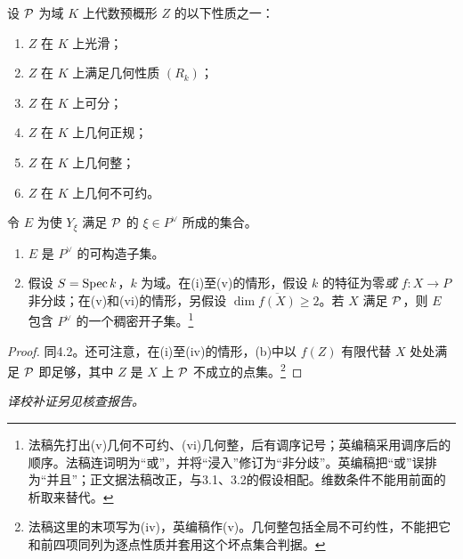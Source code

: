 设 $\mathcal P$ 为域 $K$ 上代数预概形 $Z$ 的以下性质之一：
\begin{enumerate}[label=(\roman*),nosep]
\item $Z$ 在 $K$ 上光滑；
\item $Z$ 在 $K$ 上满足几何性质 $(R_k)$；
\item $Z$ 在 $K$ 上可分；
\item $Z$ 在 $K$ 上几何正规；
\item $Z$ 在 $K$ 上几何整；
\item $Z$ 在 $K$ 上几何不可约。
\end{enumerate}
令 $E$ 为使 $Y_\xi$ 满足 $\mathcal P$ 的 $\xi\in P^\vee$ 所成的集合。
\begin{enumerate}[label=(\alph*),nosep]
\item $E$ 是 $P^\vee$ 的可构造子集。
\item 假设 $S=\operatorname{Spec} k$，$k$ 为域。在(i)至(v)的情形，假设 $k$ 的特征为零\emph{或} $f:X\to P$ 非分歧；在(v)和(vi)的情形，另假设 $\dim\overline{f(X)}\geq2$。若 $X$ 满足 $\mathcal P$，则 $E$ 包含 $P^\vee$ 的一个稠密开子集。\footnote{法稿先打出(v)几何不可约、(vi)几何整，后有调序记号；英编稿采用调序后的顺序。法稿连词明为“或”，并将“浸入”修订为“非分歧”。英编稿把“或”误排为“并且”；正文据法稿改正，与3.1、3.2的假设相配。维数条件不能用前面的析取来替代。}
\end{enumerate}
\begin{proof}
同4.2。还可注意，在(i)至(iv)的情形，(b)中以 $f(Z)$ 有限代替 $X$ 处处满足 $\mathcal P$ 即足够，其中 $Z$ 是 $X$ 上 $\mathcal P$ 不成立的点集。\footnote{法稿这里的末项写为(iv)，英编稿作(v)。几何整包括全局不可约性，不能把它和前四项同列为逐点性质并套用这个坏点集合判据。}
\end{proof}

\par\noindent\textit{译校补证另见核查报告。}

\endgroup
